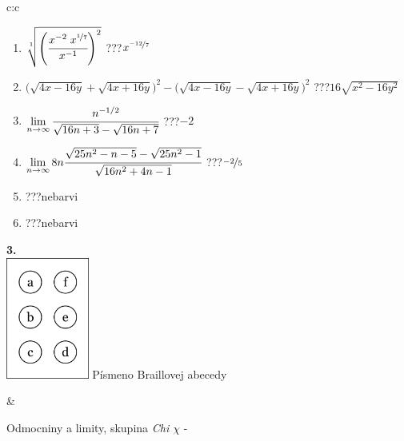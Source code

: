\documentclass[10pt]{report}
\begin{document}
\begin{tabular}{c:c}
\begin{minipage}[c][104.5mm][t]{0.5\linewidth}
\begin{center}
\begin{minipage}{0.79\linewidth}
\begin{center}
\begin{varwidth}{\linewidth}
\begin{enumerate}
\small
\item $\sqrt[1]{\left(\cfrac{x^{-2}\;x^{\nicefrac{1}{7}}}{x^{-1}}\right)^{2}}$\quad \dotfill\; ???\;\dotfill \quad $x^{\nicefrac{-12}{7}}$
\item {\footnotesize{\scriptsize$\big(\sqrt{4x-16y}+\sqrt{4x+16y}\big)^2-\big(\sqrt{4x-16y}-\sqrt{4x+16y}\big)^2$}\quad \dotfill\; ???\;\dotfill \quad $16\sqrt{x^2-16y^2}$}
\item $\lim\limits_{n\to\infty}\cfrac{n^{-1/2}}{\sqrt{16n+3}-\sqrt{16n+7}}$\quad \dotfill\; ???\;\dotfill \quad $-2$
\item $\lim\limits_{n\to\infty}8n\cfrac{\sqrt{25n^2-n-5}-\sqrt{25n^2-1}}{\sqrt{16n^2+4n-1}}$\quad \dotfill\; ???\;\dotfill \quad $\nicefrac{-2}{5}$
\item \quad \dotfill\; ???\;\dotfill \quad nebarvi
\item \quad \dotfill\; ???\;\dotfill \quad nebarvi
\end{enumerate}
\end{varwidth}
\end{center}
\end{minipage}
\begin{minipage}{0.20\linewidth}
\begin{center}
{\Huge\bfseries 3.} \\[2mm]
\includegraphics[height=40mm]{../images/braille.png}
{\small Písmeno Braillovej abecedy}
\end{center}
\end{minipage}
\end{center}
\end{minipage}
&
\begin{minipage}[c][104.5mm][t]{0.5\linewidth}
\begin{center}
\vspace{7mm}
{\huge Odmocniny a limity, skupina \textit{Chi $\chi$} -}\\[5mm]

\end{center}
\end{minipage}
\end{tabular}
\end{document}
